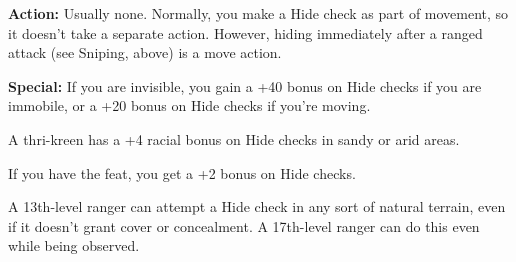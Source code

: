\textbf{Action:} Usually none. Normally, you make a Hide check as part of movement, so it doesn't take a separate action. However, hiding immediately after a ranged attack (see Sniping, above) is a move action.

\textbf{Special:} If you are invisible, you gain a +40 bonus on Hide checks if you are immobile, or a +20 bonus on Hide checks if you're moving.

A thri-kreen has a +4 racial bonus on Hide checks in sandy or arid areas.

If you have the  feat, you get a +2 bonus on Hide checks.

A 13th-level ranger can attempt a Hide check in any sort of natural terrain, even if it doesn't grant cover or concealment. A 17th-level ranger can do this even while being observed.
